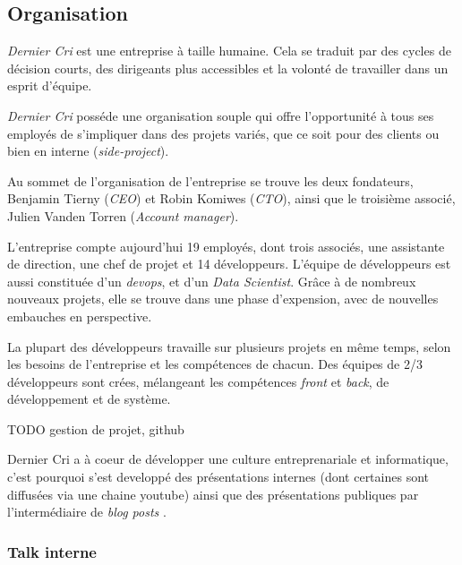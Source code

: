 \bigskip

\subsection{Organisation}\label{organisation}

\bigskip

\emph{Dernier Cri} est une entreprise à taille humaine. Cela se traduit
par des cycles de décision courts, des dirigeants plus accessibles et la
volonté de travailler dans un esprit d'équipe.

\bigskip

\emph{Dernier Cri} posséde une organisation souple qui offre
l'opportunité à tous ses employés de s'impliquer dans des projets
variés, que ce soit pour des clients ou bien en interne
(\emph{side-project}).

\bigskip

Au sommet de l'organisation de l'entreprise se trouve les deux
fondateurs, Benjamin Tierny (\emph{CEO}) et Robin Komiwes (\emph{CTO}),
ainsi que le troisième associé, Julien Vanden Torren (\emph{Account
manager}).

\bigskip

L'entreprise compte aujourd'hui 19 employés, dont trois associés, une
assistante de direction, une chef de projet et 14 développeurs. L'équipe
de développeurs est aussi constituée d'un \emph{devops}, et d'un
\emph{Data Scientist}. Grâce à de nombreux nouveaux projets, elle se
trouve dans une phase d'expension, avec de nouvelles embauches en
perspective.

\bigskip

La plupart des développeurs travaille sur plusieurs projets en même
temps, selon les besoins de l'entreprise et les compétences de chacun.
Des équipes de 2/3 développeurs sont crées, mélangeant les compétences
\emph{front} et \emph{back}, de développement et de système.

\bigskip

TODO gestion de projet, github

\bigskip

Dernier Cri a à coeur de développer une culture entreprenariale et
informatique, c'est pourquoi s'est developpé des présentations internes
(dont certaines sont diffusées via une chaine youtube) ainsi que des
présentations publiques par l'intermédiaire de \emph{blog posts} .

\subsubsection{Talk interne}\label{talk-interne}

